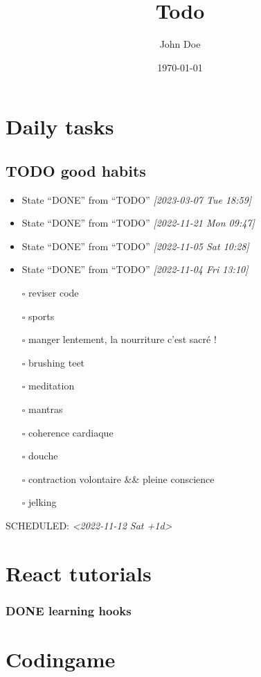 \documentclass[11pt]{article}
\author{John Doe}
\date{\today}
\title{Todo}
\begin{document}
\maketitle
\tableofcontents


\section{Daily tasks}
\label{sec:orga651bf0}
\subsection{{\bfseries\sffamily TODO} good habits}
\label{sec:org6af1a86}
\begin{itemize}
\item State ``DONE''       from ``TODO''       \textit{[2023-03-07 Tue 18:59]}
\item State ``DONE''       from ``TODO''       \textit{[2022-11-21 Mon 09:47]}
\item State ``DONE''       from ``TODO''       \textit{[2022-11-05 Sat 10:28]}
\item State ``DONE''       from ``TODO''       \textit{[2022-11-04 Fri 13:10]}
\item[{$\square$}] reviser code
\item[{$\square$}] sports
\item[{$\square$}] manger lentement, la nourriture c'est sacré !
\item[{$\square$}] brushing teet
\item[{$\square$}] meditation
\item[{$\square$}] mantras
\item[{$\square$}] coherence cardiaque
\item[{$\square$}] douche
\item[{$\square$}] contraction volontaire \&\& pleine conscience
\item[{$\square$}] jelking
\end{itemize}
SCHEDULED: \textit{<2022-11-12 Sat +1d>}
\section{React tutorials}
\label{sec:org707ef00}
\subsubsection{{\bfseries\sffamily DONE} learning hooks}
\label{sec:orge12ba3b}
\section{Codingame}
\label{sec:org85e53eb}
\end{document}
